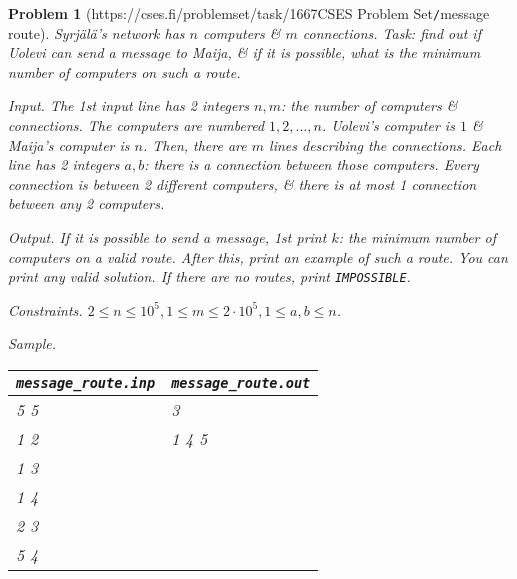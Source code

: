 \documentclass{article}
\newtheorem{problem}{Problem}
\begin{document}
\begin{problem}[{https://cses.fi/problemset/task/1667}{CSES Problem Set{\tt/}message route}]
	Syrjälä's network has $n$ computers \& $m$ connections. Task: find out if Uolevi can send a message to Maija, \& if it is possible, what is the minimum number of computers on such a route.
	\item {\sf Input.} The 1st input line has 2 integers $n,m$: the number of computers \& connections. The computers are numbered $1,2,\ldots,n$. Uolevi's computer is $1$ \& Maija's computer is $n$. Then, there are $m$ lines describing the connections. Each line has 2 integers $a,b$: there is a connection between those computers. Every connection is between 2 different computers, \& there is at most 1 connection between any 2 computers.
	\item {\sf Output.} If it is possible to send a message, 1st print $k$: the minimum number of computers on a valid route. After this, print an example of such a route. You can print any valid solution. If there are no routes, print {\tt IMPOSSIBLE}.
	\item {\sf Constraints.} $2\le n\le10^5,1\le m\le2\cdot10^5,1\le a,b\le n$.
	\item {\sf Sample.}
	\begin{table}[H]
		\centering
		\begin{tabular}{|l|l|}
			\hline
			\verb|message_route.inp| & \verb|message_route.out| \\
			\hline
			5 5 & 3 \\
			1 2 & 1 4 5 \\
			1 3 & \\
			1 4 & \\
			2 3 & \\
			5 4 & \\
			\hline
		\end{tabular}
	\end{table}
\end{problem}
\end{document}
